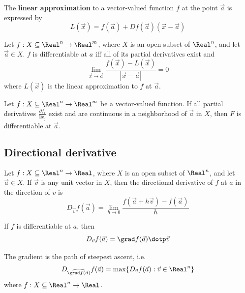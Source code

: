 \begin{definition}
  The \textbf{linear approximation} to a vector-valued function $f$ at the point $\vec{a}$ is expressed by
  \[
    L(\vec{x}) = f(\vec{a}) + Df(\vec{a})(\vec{x} - \vec{a})
  \]
\end{definition}

\begin{definition}[Differentiability]
  Let $f : X \subseteq \Real^n \to \Real^m$, where $X$ is an open subset of $\Real^n$, and let $\vec{a} \in X$. $f$ is differentiable at $a$ iff all of its partial derivatives exist and 
  \[
    \lim_{\vec{x} \to \vec{a}} \frac{f(\vec{x}) - L(\vec{x})}{|\vec{x} - \vec{a}|} = 0
  \]
  where $L(\vec{x})$ is the linear approximation to $f$ at $\vec{a}$.
\end{definition}

\begin{theorem}
  Let $f : X \subseteq \Real^n \to \Real^m$ be a vector-valued function. If all partial derivatives $\frac{\partial f_i}{\partial x_j}$ exist and are continuous in a neighborhood of $\vec{a}$ in $X$, then $F$ is differentiable at $\vec{a}$.
\end{theorem}

\subsection{Directional derivative}


\begin{definition}
  Let $f : X \subseteq \Real^n \to \Real$, where $X$ is an open subset of $\Real^n$, and let $\vec{a} \in X$. If $\vec{v}$ is any unit vector in $X$, then the directional derivative of $f$ at $a$ in the direction of $v$ is
  \[
    D_{\vec{v}} f(\vec{a}) = \lim_{h \to 0} \frac{f(\vec{a} + h\vec{v}) - f(\vec{a})}{h}
  \]
\end{definition}

\begin{theorem}
  If $f$ is differentiable at $a$, then
  \[
    D_{\vec{v}} f(\vec{a}) = \grad f(\vec{a}) \dotp \vec{v}
  \]
\end{theorem}

\begin{theorem}
  The gradient is the path of steepest ascent, i.e.
  \[
    D_{\widehat{\grad f(\vec{a})}} f(\vec{a}) = \max \{ D_{\vec{v}} f(\vec{a}) : \vec{v} \in \Real^n \}
  \]
  where $f : X \subseteq \Real^n \to \Real$.
\end{theorem}

